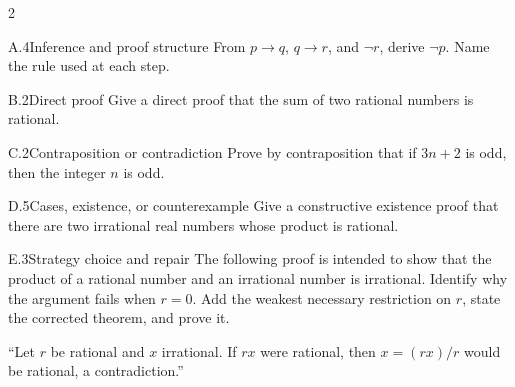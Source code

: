 \documentclass[9pt]{extarticle}
\begin{document}
\begin{multicols}{2}
\begin{CoreProblem}{A.4}{Inference and proof structure}
From $p\to q$, $q\to r$, and $\neg r$, derive $\neg p$. Name the rule used at
each step.
\end{CoreProblem}
\begin{CoreProblem}{B.2}{Direct proof}
Give a direct proof that the sum of two rational numbers is rational.
\end{CoreProblem}
\begin{CoreProblem}{C.2}{Contraposition or contradiction}
Prove by contraposition that if $3n+2$ is odd, then the integer $n$ is odd.
\end{CoreProblem}
\columnbreak
\begin{CoreProblem}{D.5}{Cases, existence, or counterexample}
Give a constructive existence proof that there are two irrational real numbers
whose product is rational.
\end{CoreProblem}
\begin{CoreProblem}{E.3}{Strategy choice and repair}
The following proof is intended to show that the product of a rational number
and an irrational number is irrational. Identify why the argument fails when
$r=0$. Add the weakest necessary restriction on $r$, state the corrected
theorem, and prove it.

``Let $r$ be rational and $x$ irrational. If $rx$ were rational, then $x=(rx)/r$ would be rational, a contradiction.''
\end{CoreProblem}
\end{multicols}
\CoreWorkArea
\FormBreak
{}
\end{document}
